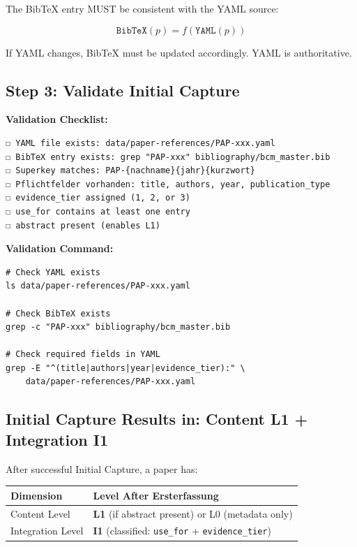 \begin{tcolorbox}[colback=green!5!white, colframe=green!75!black,
    title=\textbf{Axiom ERST-2: YAML-BibTeX Consistency}]

The BibTeX entry MUST be consistent with the YAML source:

\begin{equation}
\texttt{BibTeX}(p) = f(\texttt{YAML}(p))
\end{equation}

If YAML changes, BibTeX must be updated accordingly. YAML is authoritative.

\end{tcolorbox}

\subsection{Step 3: Validate Initial Capture}
\label{sec:ersterfassung-validate}

\textbf{Validation Checklist:}

\begin{verbatim}
☐ YAML file exists: data/paper-references/PAP-xxx.yaml
☐ BibTeX entry exists: grep "PAP-xxx" bibliography/bcm_master.bib
☐ Superkey matches: PAP-{nachname}{jahr}{kurzwort}
☐ Pflichtfelder vorhanden: title, authors, year, publication_type
☐ evidence_tier assigned (1, 2, or 3)
☐ use_for contains at least one entry
☐ abstract present (enables L1)
\end{verbatim}

\textbf{Validation Command:}

\begin{verbatim}
# Check YAML exists
ls data/paper-references/PAP-xxx.yaml

# Check BibTeX exists
grep -c "PAP-xxx" bibliography/bcm_master.bib

# Check required fields in YAML
grep -E "^(title|authors|year|evidence_tier):" \
    data/paper-references/PAP-xxx.yaml
\end{verbatim}

\subsection{Initial Capture Results in: Content L1 + Integration I1}
\label{sec:ersterfassung-result}

After successful Initial Capture, a paper has:

\begin{table}[H]
\centering
\begin{tabular}{@{}ll@{}}
\toprule
\textbf{Dimension} & \textbf{Level After Ersterfassung} \\
\midrule
Content Level & \textbf{L1} (if abstract present) or L0 (metadata only) \\
Integration Level & \textbf{I1} (classified: \texttt{use\_for} + \texttt{evidence\_tier}) \\
\bottomrule
\end{tabular}
\end{table}

